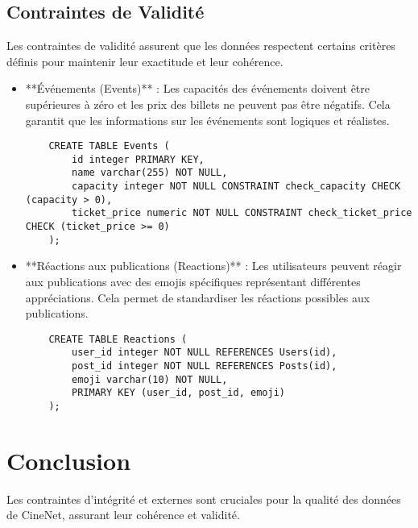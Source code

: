 \subsection{Contraintes de Validité}

Les contraintes de validité assurent que les données respectent certains critères définis pour maintenir leur exactitude et leur cohérence.

\begin{itemize}
    \item **Événements (Events)** : Les capacités des événements doivent être supérieures à zéro et les prix des billets ne peuvent pas être négatifs. Cela garantit que les informations sur les événements sont logiques et réalistes.
    \begin{lstlisting}
    CREATE TABLE Events (
        id integer PRIMARY KEY,
        name varchar(255) NOT NULL,
        capacity integer NOT NULL CONSTRAINT check_capacity CHECK (capacity > 0),
        ticket_price numeric NOT NULL CONSTRAINT check_ticket_price CHECK (ticket_price >= 0)
    );
    \end{lstlisting}
    \item **Réactions aux publications (Reactions)** : Les utilisateurs peuvent réagir aux publications avec des emojis spécifiques représentant différentes appréciations. Cela permet de standardiser les réactions possibles aux publications.
    \begin{lstlisting}
    CREATE TABLE Reactions (
        user_id integer NOT NULL REFERENCES Users(id),
        post_id integer NOT NULL REFERENCES Posts(id),
        emoji varchar(10) NOT NULL,
        PRIMARY KEY (user_id, post_id, emoji)
    );
    \end{lstlisting}
\end{itemize}

\section*{Conclusion}

Les contraintes d'intégrité et externes sont cruciales pour la qualité des données de CineNet, assurant leur cohérence et validité.
